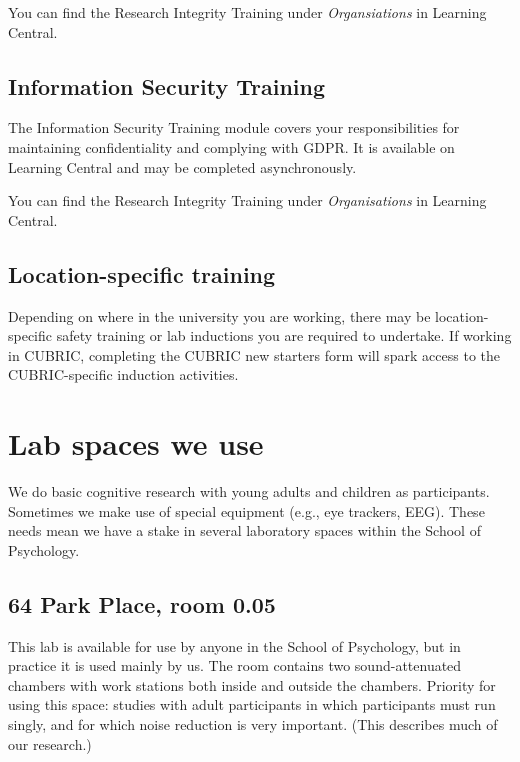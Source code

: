 \documentclass[
  12pt,
]{book}
\begin{document}
You can find the Research Integrity Training under \emph{Organsiations} in Learning Central.

\section{Information Security Training}\label{information-security-training}

The Information Security Training module covers your responsibilities for maintaining confidentiality and complying with GDPR. It is available on Learning Central and may be completed asynchronously.

You can find the Research Integrity Training under \emph{Organisations} in Learning Central.

\section{Location-specific training}\label{location-specific-training}

Depending on where in the university you are working, there may be location-specific safety training or lab inductions you are required to undertake. If working in CUBRIC, completing the CUBRIC new starters form will spark access to the CUBRIC-specific induction activities.

\chapter{Lab spaces we use}\label{lab-spaces-we-use}

We do basic cognitive research with young adults and children as participants. Sometimes we make use of special equipment (e.g., eye trackers, EEG). These needs mean we have a stake in several laboratory spaces within the School of Psychology.

\section{64 Park Place, room 0.05}\label{park-place-room-0.05}

This lab is available for use by anyone in the School of Psychology, but in practice it is used mainly by us. The room contains two sound-attenuated chambers with work stations both inside and outside the chambers. Priority for using this space: studies with adult participants in which participants must run singly, and for which noise reduction is very important. (This describes much of our research.)
\end{document}
